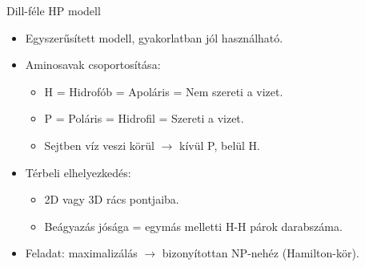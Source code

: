 \documentclass[aspectratio=169]{beamer}
\begin{document}
\begin{frame}{Dill-féle HP modell}
\begin{itemize}
    \item Egyszerűsített modell, gyakorlatban jól használható.
    \item Aminosavak csoportosítása:
    \begin{itemize}
        \item H = Hidrofób = Apoláris = Nem szereti a vizet.
        \item P = Poláris = Hidrofil = Szereti a vizet.
        \item Sejtben víz veszi körül $\rightarrow$ kívül P, belül H.
    \end{itemize}
    \item Térbeli elhelyezkedés:
    \begin{itemize}
        \item 2D vagy 3D rács pontjaiba.
        \item Beágyazás jósága = egymás melletti H-H párok darabszáma.
    \end{itemize}
    \item Feladat: maximalizálás $\rightarrow$ bizonyítottan NP-nehéz (Hamilton-kör).
\end{itemize}
\end{frame}
\end{document}
